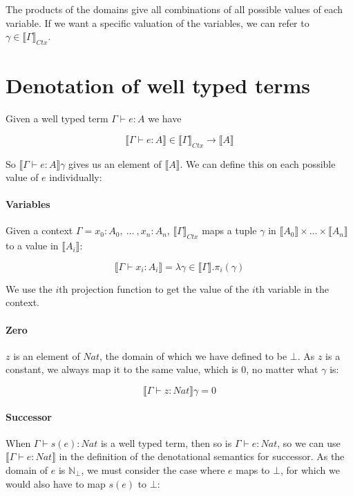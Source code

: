 The products of the domains give all combinations of all possible values of each variable. If we want a specific valuation of the variables, we can refer to $\gamma \in \llbracket \Gamma \rrbracket_{Ctx}$.

\section{Denotation of well typed terms}

Given a well typed term $\Gamma \vdash e : A$ we have

\[ \llbracket \Gamma \vdash e : A \rrbracket \in \llbracket \Gamma \rrbracket_{Ctx} \to \llbracket A \rrbracket \]

So $\llbracket \Gamma \vdash e : A \rrbracket \gamma$ gives us an element of $\llbracket A \rrbracket$. We can define this on each possible value of $e$ individually:

\paragraph{Variables} 

Given a context $\Gamma = x_0 : A_0, \ \dots \ ,x_n : A_n$, $\llbracket \Gamma \rrbracket_{Ctx}$ maps a tuple $\gamma$ in $\llbracket A_0 \rrbracket \times \dots \times \llbracket A_n \rrbracket$ to a value in $\llbracket A_i \rrbracket$:

\[\llbracket \Gamma \vdash x_i : A_i \rrbracket  = \lambda \gamma \in \llbracket \Gamma \rrbracket . \pi_i (\gamma)\]

We use the $i$th projection function to get the value of the $i$th variable in the context.

\paragraph{Zero}
$z$ is an element of $Nat$, the domain of which we have defined to be $\mathbb{\bot}$. As $z$ is a constant, we always map it to the same value, which is 0, no matter what $\gamma$ is:

\[ \llbracket \Gamma \vdash z : Nat \rrbracket \gamma = 0\]

\paragraph{Successor} 
When $\Gamma \vdash s(e) : Nat$ is a well typed term, then so is $\Gamma \vdash e : Nat$, so we can use $\llbracket \Gamma \vdash e : Nat \rrbracket$ in the definition of the denotational semantics for successor. As the domain of $e$ is $\mathbb{N}_{\bot}$, we must consider the case where $e$ maps to $\bot$, for which we would also have to map $s(e)$ to $\bot$:

